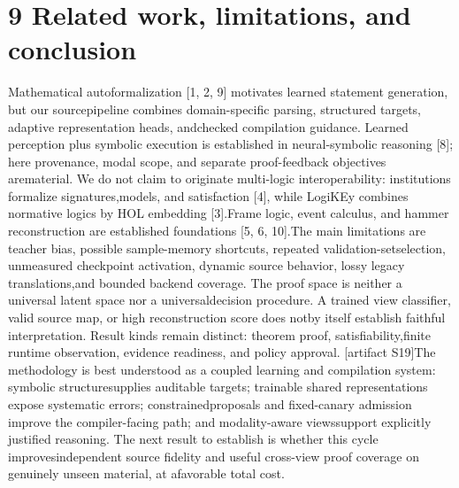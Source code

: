 \section*{9  Related work, limitations, and conclusion}
\noindent
Mathematical autoformalization [1, 2, 9] motivates learned statement generation, but our source\linebreak[4]
pipeline combines domain-specific parsing, structured targets, adaptive representation heads, and\linebreak[4]
checked compilation guidance. Learned perception plus symbolic execution is established in neural-\linebreak[4]
symbolic reasoning [8]; here provenance, modal scope, and separate proof-feedback objectives are\linebreak[4]
material. We do not claim to originate multi-logic interoperability: institutions formalize signatures,\linebreak[4]
models, and satisfaction [4], while LogiKEy combines normative logics by HOL embedding [3].\linebreak[4]
Frame logic, event calculus, and hammer reconstruction are established foundations [5, 6, 10].\linebreak[4]
The main limitations are teacher bias, possible sample-memory shortcuts, repeated validation-set\linebreak[4]
selection, unmeasured checkpoint activation, dynamic source behavior, lossy legacy translations,\linebreak[4]
and bounded backend coverage. The proof space is neither a universal latent space nor a universal\linebreak[4]
decision procedure. A trained view classifier, valid source map, or high reconstruction score does not\linebreak[4]
by itself establish faithful interpretation. Result kinds remain distinct: theorem proof, satisfiability,\linebreak[4]
finite runtime observation, evidence readiness, and policy approval. [artifact S19]\linebreak[4]
The methodology is best understood as a coupled learning and compilation system: symbolic structure\linebreak[4]
supplies auditable targets; trainable shared representations expose systematic errors; constrained\linebreak[4]
proposals and fixed-canary admission improve the compiler-facing path; and modality-aware views\linebreak[4]
support explicitly justified reasoning. The next result to establish is whether this cycle improves\linebreak[4]
independent source fidelity and useful cross-view proof coverage on genuinely unseen material, at a\linebreak[4]
favorable total cost.\par

